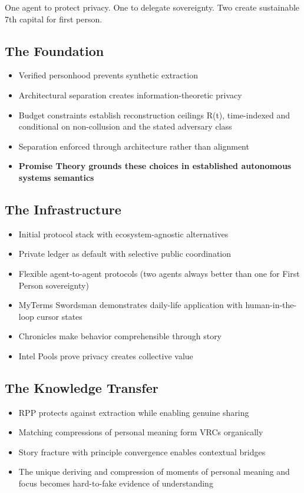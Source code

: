 \documentclass[
  11pt,
]{article}
\begin{document}
One agent to protect privacy. One to delegate sovereignty. Two create
sustainable 7th capital for first person.

\subsection{The Foundation}\label{the-foundation}

\begin{itemize}
\item
  Verified personhood prevents synthetic extraction
\item
  Architectural separation creates information-theoretic privacy
\item
  Budget constraints establish reconstruction ceilings R(t),
  time-indexed and conditional on non-collusion and the stated adversary
  class
\item
  Separation enforced through architecture rather than alignment
\item
  \textbf{Promise Theory grounds these choices in established autonomous
  systems semantics}
\end{itemize}

\subsection{The Infrastructure}\label{the-infrastructure}

\begin{itemize}
\item
  Initial protocol stack with ecosystem-agnostic alternatives
\item
  Private ledger as default with selective public coordination
\item
  Flexible agent-to-agent protocols (two agents always better than one
  for First Person sovereignty)
\item
  MyTerms Swordsman demonstrates daily-life application with
  human-in-the-loop cursor states
\item
  Chronicles make behavior comprehensible through story
\item
  Intel Pools prove privacy creates collective value
\end{itemize}

\subsection{The Knowledge Transfer}\label{the-knowledge-transfer}

\begin{itemize}
\item
  RPP protects against extraction while enabling genuine sharing
\item
  Matching compressions of personal meaning form VRCs organically
\item
  Story fracture with principle convergence enables contextual bridges
\item
  The unique deriving and compression of moments of personal meaning and
  focus becomes hard-to-fake evidence of understanding
\end{itemize}
\end{document}
